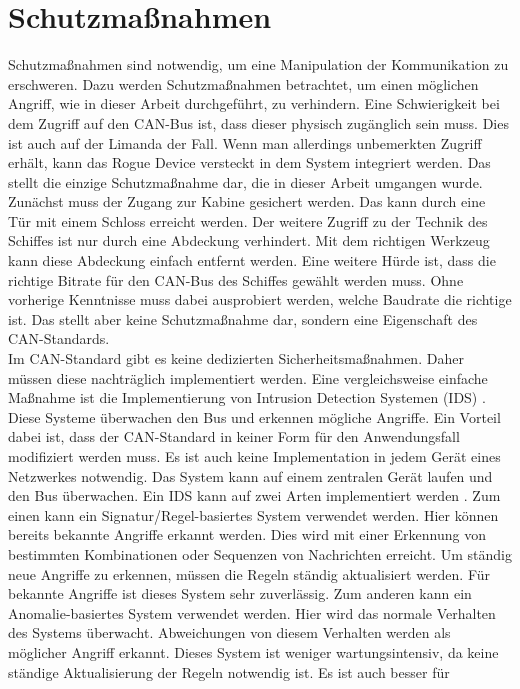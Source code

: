 \section{Schutzmaßnahmen} \label{sec:schutzmassnahmen}
Schutzmaßnahmen sind notwendig, um eine Manipulation der Kommunikation zu erschweren. Dazu werden Schutzmaßnahmen betrachtet,
um einen möglichen Angriff, wie in dieser Arbeit durchgeführt, zu verhindern.
Eine Schwierigkeit bei dem Zugriff auf den CAN-Bus ist, dass dieser physisch zugänglich sein muss. Dies ist auch auf der Limanda
der Fall. Wenn man allerdings unbemerkten Zugriff erhält, kann das Rogue Device versteckt in dem System integriert werden. 
Das stellt die einzige Schutzmaßnahme dar, die in dieser Arbeit umgangen wurde. Zunächst muss der Zugang zur Kabine 
gesichert werden. Das kann durch eine Tür mit einem Schloss erreicht werden.
Der weitere Zugriff zu der Technik des Schiffes ist nur durch eine Abdeckung
verhindert. Mit dem richtigen Werkzeug kann diese Abdeckung einfach entfernt werden.
Eine weitere Hürde ist, dass die richtige Bitrate für den CAN-Bus des Schiffes gewählt werden muss. Ohne vorherige Kenntnisse
muss dabei ausprobiert werden, welche Baudrate die richtige ist. Das stellt aber keine Schutzmaßnahme dar, sondern
eine Eigenschaft des CAN-Standards.\\
Im CAN-Standard gibt es keine dedizierten Sicherheitsmaßnahmen. Daher müssen diese nachträglich implementiert werden.
Eine vergleichsweise einfache Maßnahme ist die Implementierung von Intrusion Detection Systemen (IDS) \cite{Gmiden2016}. 
Diese Systeme überwachen
den Bus und erkennen mögliche Angriffe. Ein Vorteil dabei ist, dass der CAN-Standard in keiner Form für den 
Anwendungsfall modifiziert werden muss. Es ist auch keine Implementation in jedem Gerät eines Netzwerkes notwendig.
Das System kann auf einem zentralen Gerät laufen und den Bus überwachen.  
Ein IDS kann auf zwei Arten implementiert werden \cite{Hoppe2009}. Zum einen kann ein Signatur/Regel-basiertes System verwendet werden.
Hier können bereits bekannte Angriffe erkannt werden. Dies wird mit einer Erkennung von bestimmten Kombinationen oder Sequenzen
von Nachrichten erreicht. Um ständig neue Angriffe zu erkennen, müssen die Regeln ständig aktualisiert werden.
Für bekannte Angriffe ist dieses System sehr zuverlässig. Zum anderen kann ein Anomalie-basiertes System verwendet werden.
Hier wird das normale Verhalten des Systems überwacht. Abweichungen von diesem Verhalten werden als möglicher Angriff erkannt.
Dieses System ist weniger wartungsintensiv, da keine ständige Aktualisierung der Regeln notwendig ist. Es ist auch besser für
